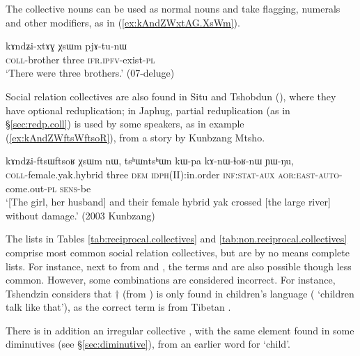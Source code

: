 The collective nouns can be used as normal nouns and take flagging, numerals and other modifiers, as in  (\ref{ex:kAndZWxtAG.XsWm}).

\begin{exe}
\ex \label{ex:kAndZWxtAG.XsWm}
\gll kɤndʑi-xtɤɣ χsɯm pjɤ-tu-nɯ \\
\textsc{coll}-brother three \textsc{ifr}.\textsc{ipfv}-exist-\textsc{pl} \\
\glt `There were three brothers.' (07-deluge) 
\end{exe}

Social relation collectives are also found in Situ and Tshobdun (\citealt[107]{jackson98morphology}), where they have optional reduplication; in Japhug, partial reduplication (as in §\ref{sec:redp.coll}) is used by some speakers, as  in example (\ref{ex:kAndZWftsWftsoR}), from a story by Kunbzang Mtsho.

\begin{exe}
\ex \label{ex:kAndZWftsWftsoR}
 \gll kɤndʑi-ftsɯ\redp{}ftsoʁ χsɯm nɯ, tsʰɯntsʰɯn kɯ-pa kɤ-nɯ-ɬoʁ-nɯ ɲɯ-ŋu, \\
 \textsc{coll}-female.yak.hybrid three \textsc{dem} \textsc{idph}(II):in.order \textsc{inf}:\textsc{stat}-\textsc{aux} \textsc{aor}:\textsc{east}-\textsc{auto}-come.out-\textsc{pl} \textsc{sens}-be \\
\glt `[The girl, her husband] and their female hybrid yak crossed [the large river] without damage.' (2003 Kunbzang)
\end{exe}

The lists in Tables \ref{tab:reciprocal.collectives} and \ref{tab:non.reciprocal.collectives} comprise most common social relation collectives, but are by no means complete lists. For instance, next to  from  and , the terms  and  are also possible though less common. However, some combinations are considered incorrect. For instance, Tshendzin considers that $\dagger$ (from ) is only found in children's language ( `children talk like that'), as the correct term is  from Tibetan .

There is in addition an irregular collective , with the same element  found in some diminutives (see §\ref{sec:diminutive}), from an earlier word for `child'.

